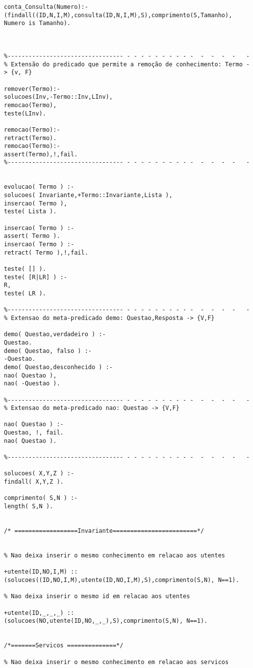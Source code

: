 \documentclass[pdftex,12pt,a4paper]{report}
\begin{document}
\begin{appendices}
\begin{verbatim}
conta_Consulta(Numero):-
(findall((ID,N,I,M),consulta(ID,N,I,M),S),comprimento(S,Tamanho),
Numero is Tamanho).



%--------------------------------- - - - - - - - - - -  -  -  -  -   -
% Extensão do predicado que permite a remoção de conhecimento: Termo -> {v, F}

remover(Termo):-
solucoes(Inv,-Termo::Inv,LInv),
remocao(Termo),
teste(LInv).

remocao(Termo):-
retract(Termo).
remocao(Termo):-
assert(Termo),!,fail.
%--------------------------------- - - - - - - - - - -  -  -  -  -   -


evolucao( Termo ) :-
solucoes( Invariante,+Termo::Invariante,Lista ),
insercao( Termo ),
teste( Lista ).

insercao( Termo ) :-
assert( Termo ).
insercao( Termo ) :-
retract( Termo ),!,fail.

teste( [] ).
teste( [R|LR] ) :-
R,
teste( LR ).

%--------------------------------- - - - - - - - - - -  -  -  -  -   -
% Extensao do meta-predicado demo: Questao,Resposta -> {V,F}

demo( Questao,verdadeiro ) :-
Questao.
demo( Questao, falso ) :-
-Questao.
demo( Questao,desconhecido ) :-
nao( Questao ),
nao( -Questao ).

%--------------------------------- - - - - - - - - - -  -  -  -  -   -
% Extensao do meta-predicado nao: Questao -> {V,F}

nao( Questao ) :-
Questao, !, fail.
nao( Questao ).

%--------------------------------- - - - - - - - - - -  -  -  -  -   -

solucoes( X,Y,Z ) :-
findall( X,Y,Z ).

comprimento( S,N ) :-
length( S,N ).


/* ==================Invariante========================*/


% Nao deixa inserir o mesmo conhecimento em relacao aos utentes

+utente(ID,NO,I,M) :: 
(solucoes((ID,NO,I,M),utente(ID,NO,I,M),S),comprimento(S,N), N==1).

% Nao deixa inserir o mesmo id em relacao aos utentes

+utente(ID,_,_,_) :: 
(solucoes(NO,utente(ID,NO,_,_),S),comprimento(S,N), N==1).


/*=======Servicos ==============*/ 

% Nao deixa inserir o mesmo conhecimento em relacao aos servicos


\end{verbatim}
\end{appendices}
\end{document}
